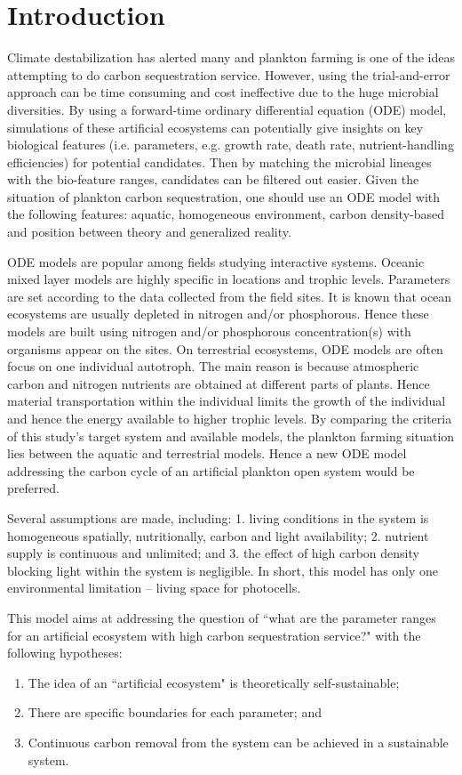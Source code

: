 \documentclass[../thesis.tex]{subfiles} %
\begin{document}
\section{Introduction}

Climate destabilization has alerted many and plankton farming is one of the ideas attempting to do carbon sequestration service.  However, using the trial-and-error approach can be time consuming and cost ineffective due to the huge microbial diversities.  By using a forward-time ordinary differential equation (ODE) model, simulations of these artificial ecosystems can potentially give insights on key biological features (i.e. parameters, e.g. growth rate, death rate, nutrient-handling efficiencies) for potential candidates.  Then by matching the microbial lineages with the bio-feature ranges, candidates can be filtered out easier.  Given the situation of plankton carbon sequestration, one should use an ODE model with the following features: aquatic, homogeneous environment, carbon density-based and position between theory and generalized reality.

ODE models are popular among fields studying interactive systems.  Oceanic mixed layer models are highly specific in locations and trophic levels.  Parameters are set according to the data collected from the field sites.  It is known that ocean ecosystems are usually depleted in nitrogen and/or phosphorous.  Hence these models are built using nitrogen and/or phosphorous concentration(s) with organisms appear on the sites.  On terrestrial ecosystems, ODE models are often focus on one individual autotroph.  The main reason is because atmospheric carbon and nitrogen nutrients are obtained at different parts of plants.  Hence material transportation within the individual limits the growth of the individual and hence the energy available to higher trophic levels.  By comparing the criteria of this study's target system and available models, the plankton farming situation lies between the aquatic and terrestrial models.  Hence a new ODE model addressing the carbon cycle of an artificial plankton open system would be preferred.

Several assumptions are made, including: 1. living conditions in the system is homogeneous spatially, nutritionally, carbon and light availability; 2. nutrient supply is continuous and unlimited; and 3. the effect of high carbon density blocking light within the system is negligible.  In short, this model has only one environmental limitation -- living space for photocells.

This model aims at addressing the question of ``what are the parameter ranges for an artificial ecosystem with high carbon sequestration service?" with the following hypotheses:

\begin{enumerate}
    \item The idea of an ``artificial ecosystem" is theoretically self-sustainable;
    \item There are specific boundaries for each parameter; and
    \item Continuous carbon removal from the system can be achieved in a sustainable system.
\end{enumerate}
\end{document}
